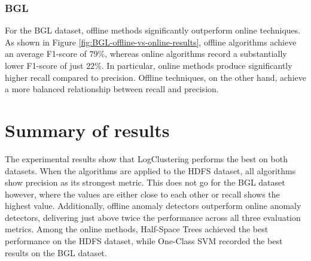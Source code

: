 \subsubsection{BGL}
For the BGL dataset, offline methods significantly outperform online techniques. As shown in Figure \ref{fig:BGL-offline-vs-online-results}, offline algorithms achieve an average F1-score of $79$\%, whereas online algorithms record a substantially lower F1-score of just $22$\%. In particular, online methods produce significantly higher recall compared to precision. Offline techniques, on the other hand, achieve a more balanced relationship between recall and precision.


\section{Summary of results}
The experimental results show that LogClustering performs the best on both datasets. When the algorithms are applied to the HDFS dataset, all algorithms show precision as its strongest metric. This does not go for the BGL dataset however, where the values are either close to each other or recall shows the highest value. Additionally, offline anomaly detectors outperform online anomaly detectors, delivering just above twice the performance across all three evaluation metrics. Among the online methods, Half-Space Trees achieved the best performance on the HDFS dataset, while One-Class SVM recorded the best results on the BGL dataset.


